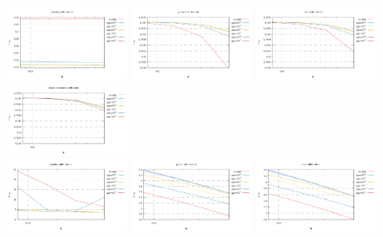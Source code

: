 \begin{center}
\includegraphics[width=4cm]{python_codes/fieldstone_115/results/ldc/vrms_penalty.pdf}
\includegraphics[width=4cm]{python_codes/fieldstone_115/results/ldc/vrms_global.pdf}
\includegraphics[width=4cm]{python_codes/fieldstone_115/results/ldc/vrms_local.pdf}
\includegraphics[width=4cm]{python_codes/fieldstone_115/results/ldc/vrms_macro.pdf}\\
\includegraphics[width=4cm]{python_codes/fieldstone_115/results/ldc/prms_penalty.pdf}
\includegraphics[width=4cm]{python_codes/fieldstone_115/results/ldc/prms_global.pdf}
\includegraphics[width=4cm]{python_codes/fieldstone_115/results/ldc/prms_local.pdf}

\end{center}

